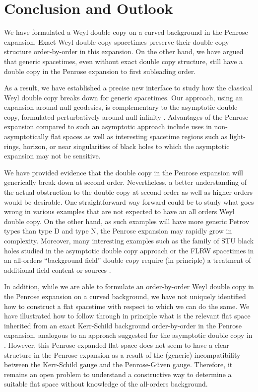\section{Conclusion and Outlook}

We have formulated a Weyl double copy on a curved background in the Penrose expansion. Exact Weyl double copy spacetimes preserve their double copy structure order-by-order in this expansion. On the other hand, we have argued that generic spacetimes, even without exact double copy structure, still have a double copy in the Penrose expansion to first subleading order. 

As a result, we have established a precise new interface to study how the classical Weyl double copy breaks down for generic spacetimes. Our approach, using an expansion around null geodesics, is complementary to the asymptotic double copy, formulated perturbatively around null infinity \cite{Godazgar:2021iae,Adamo:2021dfg}. Advantages of the Penrose expansion compared to such an asymptotic approach include uses in non-asymptotically flat spaces as well as interesting spacetime regions such as light-rings, horizon, or near singularities of black holes to which the asymptotic expansion may not be sensitive.

We have provided evidence that the double copy in the Penrose expansion will generically break down at second order. Nevertheless, a better understanding of the actual obstruction to the double copy at second order as well as higher orders would be desirable. One straightforward way forward could be to study what goes wrong in various examples that are not expected to have an all orders Weyl double copy. On the other hand, as such examples will have more generic Petrov types than type D and type N, the Penrose expansion may rapidly grow in complexity. Moreover, many interesting examples such as the family of STU black holes studied in the asymptotic double copy approach \cite{Godazgar:2021iae} or the FLRW spacetimes in an all-orders ``background field'' double copy \cite{Ilderton:2024oly} require (in principle) a treatment of additional field content or sources \cite{Cardoso:2016amd,LopesCardoso:2018xes,Easson:2021asd,Easson:2022zoh,Armstrong-Williams:2024bog}.

In addition, while we are able to formulate an order-by-order Weyl double copy in the Penrose expansion on a curved background, we have not uniquely identified how to construct a flat spacetime with respect to which we can do the same. We have illustrated how to follow through in principle what is the relevant flat space inherited from an exact Kerr-Schild background order-by-order in the Penrose expansion, analogous to an approach suggested for the asymptotic double copy in \cite{Godazgar:2021iae}. However, this Penrose expanded flat space does not seem to have a clear structure in the Penrose expansion as a result of the (generic) incompatibility between the Kerr-Schild gauge and the Penrose-G\"uven gauge. Therefore, it remains an open problem to understand a constructive way to determine a suitable flat space without knowledge of the all-orders background. 

